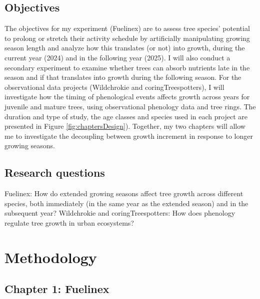 \documentclass{article}
\begin{document}
\subsection*{Objectives}  
The objectives for my experiment (Fuelinex) are to assess tree species’ potential to prolong or stretch their activity schedule by artificially manipulating growing season length and analyze how this translates (or not) into growth, during the current year (2024) and in the following year (2025). I will also conduct a secondary experiment to examine whether trees can absorb nutrients late in the season and if that translates into growth during the following season. For the observational data projects (Wildchrokie and coringTreespotters), I will investigate how the timing of phenological events affects growth across years for juvenile and mature trees, using observational phenology data and tree rings. The duration and type of study, the age classes and species used in each project are presented in Figure \ref{fig:chaptersDesign}). Together, my two chapters will allow me to investigate the decoupling between growth increment in response to longer growing seasons. 
 
\subsection* {Research questions} 
{Fuelinex}: How do extended growing seasons affect tree growth across different species, both immediately (in the same year as the extended season) and in the subsequent year?
{Wildchrokie and coringTreespotters}: How does phenology regulate tree growth in urban ecosystems? \\

\section*{Methodology} 

\subsection* {Chapter 1: Fuelinex}
\end{document}
